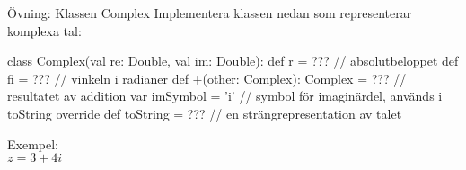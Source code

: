 

\begin{Slide}{Övning: Klassen Complex}\SlideFontSmall
Implementera klassen  nedan som representerar komplexa tal:
\begin{Code}
  class Complex(val re: Double, val im: Double):
    def r  = ???  // absolutbeloppet
    def fi = ???  // vinkeln i radianer
    def +(other: Complex): Complex = ???  // resultatet av addition
    var imSymbol = 'i'  // symbol för imaginärdel, används i toString
    override def toString = ???  // en strängrepresentation av talet
\end{Code}

\begin{minipage}{0.3\textwidth}
  Exempel: \\$z = 3 + 4i$
\end{minipage}
\begin{minipage}{0.5\textwidth}
\end{minipage}

\end{Slide}


